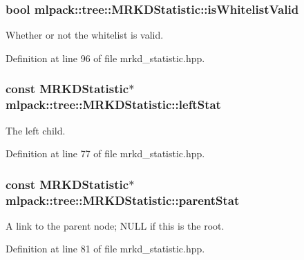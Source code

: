 \subsubsection[{is\-Whitelist\-Valid}]{\setlength{\rightskip}{0pt plus 5cm}bool mlpack\-::tree\-::\-M\-R\-K\-D\-Statistic\-::is\-Whitelist\-Valid\hspace{0.3cm}{\ttfamily [private]}}\label{classmlpack_1_1tree_1_1MRKDStatistic_a62c42d3cbf8c9abe50e4e94d84533a5b}


Whether or not the whitelist is valid. 



Definition at line 96 of file mrkd\-\_\-statistic.\-hpp.

\subsubsection[{left\-Stat}]{\setlength{\rightskip}{0pt plus 5cm}const {\bf M\-R\-K\-D\-Statistic}$\ast$ mlpack\-::tree\-::\-M\-R\-K\-D\-Statistic\-::left\-Stat\hspace{0.3cm}{\ttfamily [private]}}\label{classmlpack_1_1tree_1_1MRKDStatistic_a69620c8591b73c1e746b039cb7913491}


The left child. 



Definition at line 77 of file mrkd\-\_\-statistic.\-hpp.

\subsubsection[{parent\-Stat}]{\setlength{\rightskip}{0pt plus 5cm}const {\bf M\-R\-K\-D\-Statistic}$\ast$ mlpack\-::tree\-::\-M\-R\-K\-D\-Statistic\-::parent\-Stat\hspace{0.3cm}{\ttfamily [private]}}\label{classmlpack_1_1tree_1_1MRKDStatistic_a547bbee0feef635740be77c4b396b3af}


A link to the parent node; N\-U\-L\-L if this is the root. 



Definition at line 81 of file mrkd\-\_\-statistic.\-hpp.

